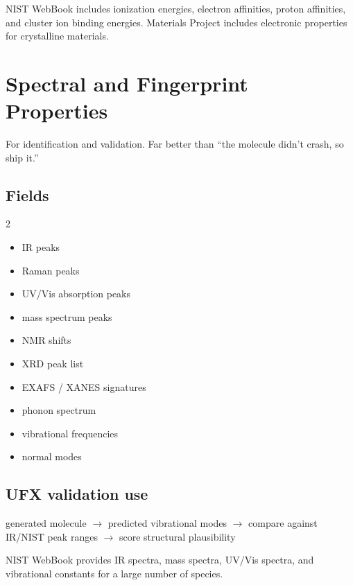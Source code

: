 \documentclass[11pt, a4paper]{article}
\begin{document}
NIST WebBook includes ionization energies, electron affinities, proton affinities, and cluster ion binding energies. Materials Project includes electronic properties for crystalline materials.

\section{Spectral and Fingerprint Properties}

For identification and validation. Far better than ``the molecule didn't crash, so ship it.''

\subsection{Fields}

\begin{multicols}{2}
\begin{itemize}[itemsep=1pt, leftmargin=*]
  \item IR peaks
  \item Raman peaks
  \item UV/Vis absorption peaks
  \item mass spectrum peaks
  \item NMR shifts
  \item XRD peak list
  \item EXAFS / XANES signatures
  \item phonon spectrum
  \item vibrational frequencies
  \item normal modes
\end{itemize}
\end{multicols}

\subsection{UFX validation use}

\begin{center}
generated molecule $\rightarrow$ predicted vibrational modes $\rightarrow$ compare against IR/NIST peak ranges $\rightarrow$ score structural plausibility
\end{center}

NIST WebBook provides IR spectra, mass spectra, UV/Vis spectra, and vibrational constants for a large number of species.

\end{document}
